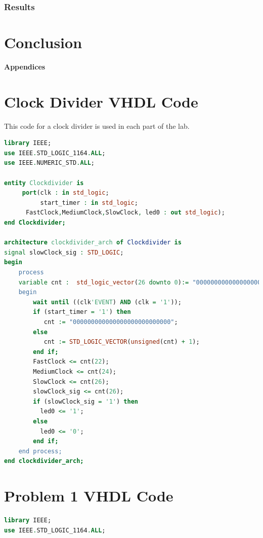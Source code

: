\documentclass[11pt]{article}
\begin{document}
\subsubsection{Results}



\section{Conclusion}


\pagebreak

\textbf{Appendices}

\begin{appendices}

\section{Clock Divider VHDL Code}
This code for a clock divider is used in each part of the lab.

\begin{lstlisting}[language=VHDL]
library IEEE;
use IEEE.STD_LOGIC_1164.ALL;
use IEEE.NUMERIC_STD.ALL;

entity Clockdivider is
     port(clk : in std_logic;
          start_timer : in std_logic;
	  FastClock,MediumClock,SlowClock, led0 : out std_logic);
end Clockdivider;

architecture clockdivider_arch of Clockdivider is
signal slowClock_sig : STD_LOGIC;
begin
    process  
    variable cnt :	std_logic_vector(26 downto 0):= "000000000000000000000000000";
    begin					 
        wait until ((clk'EVENT) AND (clk = '1'));
		if (start_timer = '1') then
	       cnt := "000000000000000000000000000";
	    else  
           cnt := STD_LOGIC_VECTOR(unsigned(cnt) + 1);
	    end if;
   	    FastClock <= cnt(22);
   	    MediumClock <= cnt(24);	
   	    SlowClock <= cnt(26);
        slowClock_sig <= cnt(26);
        if (slowClock_sig = '1') then
		  led0 <= '1';
	    else
		  led0 <= '0';
	    end if;
	end process;
end clockdivider_arch;
\end{lstlisting}

\section{Problem 1 VHDL Code}

\begin{lstlisting}[language=VHDL]
library IEEE;
use IEEE.STD_LOGIC_1164.ALL;


\end{lstlisting}
\end{appendices}
\end{document}
